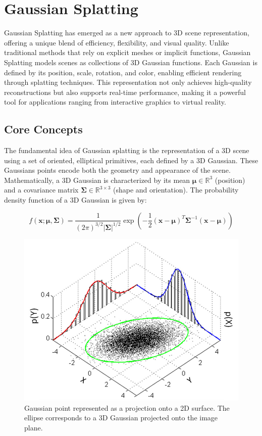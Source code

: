 \section{Gaussian Splatting}

\label{pre::gaussian-splatting}

Gaussian Splatting has emerged as a new approach to 3D scene representation, offering a unique blend of efficiency, flexibility, and visual quality. Unlike traditional methods that rely on explicit meshes or implicit functions, Gaussian Splatting models scenes as collections of 3D Gaussian functions. Each Gaussian is defined by its position, scale, rotation, and color, enabling efficient rendering through splatting techniques. This representation not only achieves high-quality reconstructions but also supports real-time performance, making it a powerful tool for applications ranging from interactive graphics to virtual reality.







\subsection{Core Concepts}

The fundamental idea of Gaussian splatting is the representation of a 3D scene using a set of oriented, elliptical primitives, each defined by a 3D Gaussian. These Gaussians points encode both the geometry and appearance of the scene. Mathematically, a 3D Gaussian is characterized by its mean $\boldsymbol{\mu} \in \mathbb{R}^3$ (position) and a covariance matrix $\boldsymbol{\Sigma} \in \mathbb{R}^{3 \times 3}$ (shape and orientation). The probability density function of a 3D Gaussian is given by:

\begin{equation}
f(\mathbf{x}; \boldsymbol{\mu}, \boldsymbol{\Sigma}) = \frac{1}{(2\pi)^{3/2}|\boldsymbol{\Sigma}|^{1/2}} \exp\left(-\frac{1}{2}(\mathbf{x}-\boldsymbol{\mu})^T\boldsymbol{\Sigma}^{-1}(\mathbf{x}-\boldsymbol{\mu})\right)
\label{eq:gaussian_pdf}
\end{equation}


\begin{figure}[ht]
    \centering
    \includegraphics[width=0.5\linewidth]{assets/image2.png}
    \caption{Gaussian point represented as a projection onto a 2D surface. The ellipse corresponds to a 3D Gaussian projected onto the image plane.}
    \label{fig:gs-distribution}
\end{figure}



